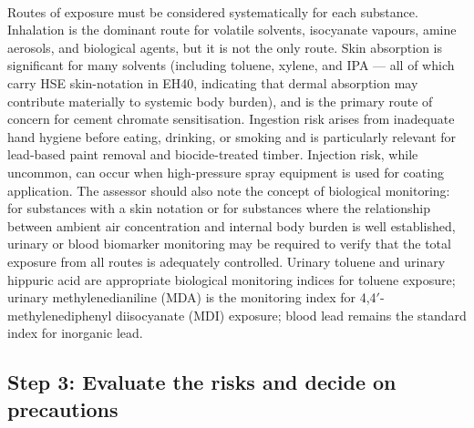 \paragraph{}
Routes of exposure must be considered systematically for each substance. Inhalation is the dominant route for volatile solvents, isocyanate vapours, amine aerosols, and biological agents, but it is not the only route. Skin absorption is significant for many solvents (including toluene, xylene, and IPA — all of which carry HSE skin-notation in EH40, indicating that dermal absorption may contribute materially to systemic body burden), and is the primary route of concern for cement chromate sensitisation. Ingestion risk arises from inadequate hand hygiene before eating, drinking, or smoking and is particularly relevant for lead-based paint removal and biocide-treated timber. Injection risk, while uncommon, can occur when high-pressure spray equipment is used for coating application. The assessor should also note the concept of biological monitoring: for substances with a skin notation or for substances where the relationship between ambient air concentration and internal body burden is well established, urinary or blood biomarker monitoring may be required to verify that the total exposure from all routes is adequately controlled. Urinary toluene and urinary hippuric acid are appropriate biological monitoring indices for toluene exposure; urinary methylenedianiline (MDA) is the monitoring index for 4,4$'$-methylenediphenyl diisocyanate (MDI) exposure; blood lead remains the standard index for inorganic lead.

\subsection{Step 3: Evaluate the risks and decide on precautions}

